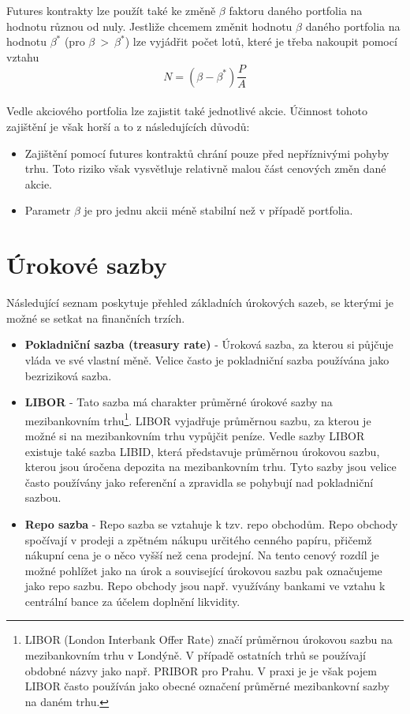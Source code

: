 \documentclass[a4paper]{book}
\begin{document}
Futures kontrakty lze použít také ke změně $\beta$ faktoru daného portfolia na hodnotu různou od nuly. Jestliže chcemem změnit hodnotu $\beta$ daného portfolia na hodnotu $\beta^*$ (pro $\beta~>~\beta^*$) lze vyjádřit počet lotů, které je třeba nakoupit pomocí vztahu
\begin{equation*}
N = (\beta - \beta^*) \frac{P}{A}
\end{equation*}\\
Vedle akciového portfolia lze zajistit také jednotlivé akcie. Účinnost tohoto zajištění je však horší a to z následujících důvodů:
\begin{itemize}
\item Zajištění pomocí futures kontraktů chrání pouze před nepříznivými pohyby trhu. Toto riziko však vysvětluje relativně malou část cenových změn dané akcie.
\item Parametr $\beta$ je pro jednu akcii méně stabilní než v případě portfolia.
\end{itemize}

\chapter{Úrokové sazby}
Následující seznam poskytuje přehled základních úrokových sazeb, se kterými je možné se setkat na finančních trzích.
\begin{itemize}
\item \textbf{Pokladniční sazba (treasury rate)} - Úroková sazba, za kterou si půjčuje vláda ve své vlastní měně. Velice často je pokladniční sazba používána jako bezriziková sazba.
\item \textbf{LIBOR} - Tato sazba má charakter průměrné úrokové sazby na mezibankovním trhu\footnote{LIBOR (London Interbank Offer Rate) značí průměrnou úrokovou sazbu na mezibankovním trhu v Londýně. V případě ostatních trhů se používají obdobné názvy jako např. PRIBOR pro Prahu. V praxi je je však pojem LIBOR často používán jako obecné označení průměrné mezibankovní sazby na daném trhu.}. LIBOR vyjadřuje průměrnou sazbu, za kterou je možné si na mezibankovním trhu vypůjčit peníze. Vedle sazby LIBOR existuje také sazba LIBID, která představuje průměrnou úrokovou sazbu, kterou jsou úročena depozita na mezibankovním trhu. Tyto sazby jsou velice často používány jako referenční a zpravidla se pohybují nad pokladniční sazbou.
\item \textbf{Repo sazba} - Repo sazba se vztahuje k tzv. repo obchodům. Repo obchody spočívají v prodeji a zpětném nákupu určitého cenného papíru, přičemž nákupní cena je o něco vyšší než cena prodejní. Na tento cenový rozdíl je možné pohlížet jako na úrok a související úrokovou sazbu pak označujeme jako repo sazbu. Repo obchody jsou např. využívány bankami ve vztahu k centrální bance za účelem doplnění likvidity.
\end{itemize}
\end{document}
